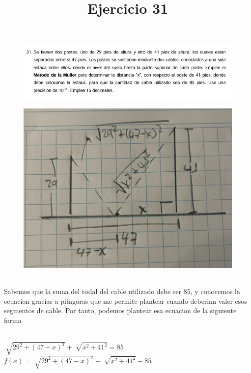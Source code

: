 \documentclass{article}
\title{Ejercicio 31}
\theoremstyle{mytheoremstyle}
\theoremstyle{mytheoremstyle}
\theoremstyle{myproblemstyle}
\begin{document}
\begin{figure}[ht]
    \includegraphics[scale=0.8]{img/mul31_1.png}
\end{figure}
\begin{figure}[ht]
    \includegraphics[scale=0.1]{img/mul31_2.jpeg}
\end{figure}
\noindent \\ Sabemos que la suma del todal del cable utilizado debe ser 85, y conocemos la ecuacion gracias a pitagoras que me permite plantear cuando deberian valer esos segmentos de cable.
Por tanto, podemos plantear esa ecuacion de la siguiente forma

\noindent \\ $\sqrt[]{29^2+(47-x)^2}+\sqrt[]{x^2+41^2}=85$
\\$f(x)=\sqrt[]{29^2+(47-x)^2}+\sqrt[]{x^2+41^2}-85$
\end{document}
